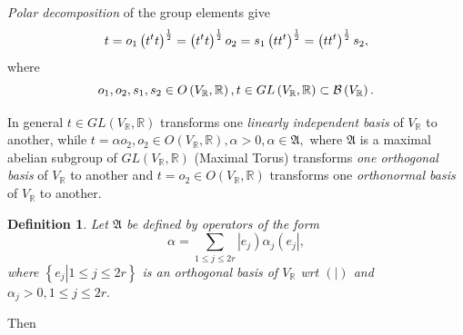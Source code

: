 \documentclass[aps,preprint]{revtex4}
\newtheorem{definition}[theorem]{Definition}
\begin{document}
\emph{Polar decomposition} of the group elements give 
\begin{equation*}
t=o_{1}\left( t^{t}t\right) ^{\frac{1}{2}}=\left( t^{t}t\right) ^{\frac{1}{2}%
}o_{2}=s_{1}\left( tt^{t}\right) ^{\frac{1}{2}}=\left( tt^{t}\right) ^{\frac{%
1}{2}}s_{2},
\end{equation*}%
where 
\begin{equation}
o_{1},o_{2},s_{1},s_{2}\in O\left( V_{\mathbb{R}},\mathbb{R}\right) ,t\in
GL\left( V_{\mathbb{R}},\mathbb{R}\right) \subset \mathcal{B}\left( V_{%
\mathbb{R}}\right) .
\end{equation}

In general $t\in GL\left( V_{\mathbb{R}},\mathbb{R}\right) $ transforms one 
\emph{linearly independent basis} of $V_{\mathbb{R}}$ to another, while $%
t=\alpha o_{2},o_{2}\in O\left( V_{\mathbb{R}},\mathbb{R}\right) ,\alpha
>0,\alpha \in \mathfrak{A,}$ where $\mathfrak{A}$ is a maximal abelian
subgroup of $GL\left( V_{\mathbb{R}},\mathbb{R}\right) $ (Maximal Torus)
transforms \emph{one orthogonal basis} of $V_{\mathbb{R}}$ to another and $%
t=o_{2}\in O\left( V_{\mathbb{R}},\mathbb{R}\right) $ transforms one \emph{%
orthonormal basis} of $V_{\mathbb{R}}$ to another.

\begin{definition}
Let $\mathfrak{A}$ be defined by operators of the form 
\begin{equation}
\alpha =\sum_{1\leq j\leq 2r}\left\vert e_{j}\right) \alpha _{j}\left(
e_{j}\right\vert ,
\end{equation}%
where $\left\{ \left. e_{j}\right\vert 1\leq j\leq 2r\right\} $ is an
orthogonal basis of $V_{\mathbb{R}}$ wrt $\left( \left. {}\right\vert
\right) $ and $\alpha _{j}>0,1\leq j\leq 2r.$
\end{definition}

Then
\end{document}
